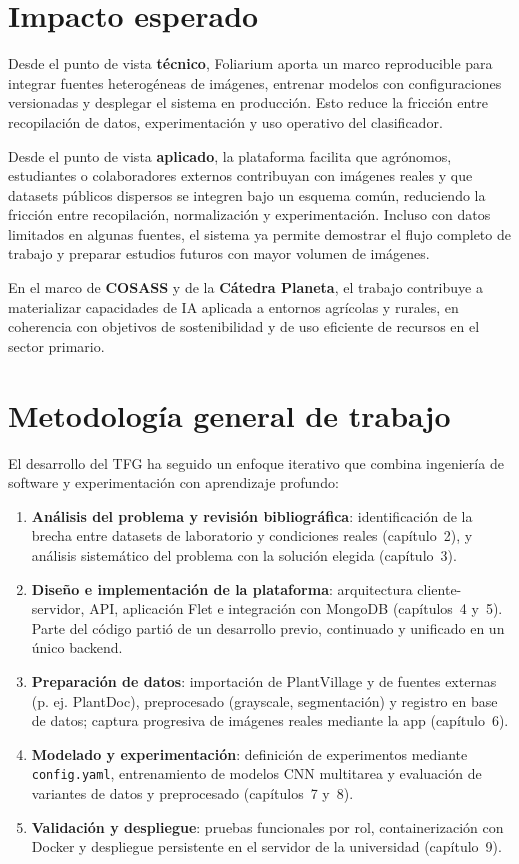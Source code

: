 \documentclass[11pt,spanish,listoffigures,listoftables]{tfgetsinf}
\begin{document}
\section{Impacto esperado}

Desde el punto de vista \textbf{técnico}, Foliarium aporta un marco reproducible para integrar fuentes heterogéneas de imágenes, entrenar modelos con configuraciones versionadas y desplegar el sistema en producción. Esto reduce la fricción entre recopilación de datos, experimentación y uso operativo del clasificador.

Desde el punto de vista \textbf{aplicado}, la plataforma facilita que agrónomos, estudiantes o colaboradores externos contribuyan con imágenes reales y que datasets públicos dispersos se integren bajo un esquema común, reduciendo la fricción entre recopilación, normalización y experimentación. Incluso con datos limitados en algunas fuentes, el sistema ya permite demostrar el flujo completo de trabajo y preparar estudios futuros con mayor volumen de imágenes.

En el marco de \textbf{COSASS} y de la \textbf{Cátedra Planeta}, el trabajo contribuye a materializar capacidades de IA aplicada a entornos agrícolas y rurales, en coherencia con objetivos de sostenibilidad y de uso eficiente de recursos en el sector primario.

\section{Metodología general de trabajo}

El desarrollo del TFG ha seguido un enfoque iterativo que combina ingeniería de software y experimentación con aprendizaje profundo:

\begin{enumerate}
    \item \textbf{Análisis del problema y revisión bibliográfica}: identificación de la brecha entre datasets de laboratorio y condiciones reales (capítulo~2), y análisis sistemático del problema con la solución elegida (capítulo~3).
    \item \textbf{Diseño e implementación de la plataforma}: arquitectura cliente-servidor, API, aplicación Flet e integración con MongoDB (capítulos~4 y~5). Parte del código partió de un desarrollo previo, continuado y unificado en un único backend.
    \item \textbf{Preparación de datos}: importación de PlantVillage y de fuentes externas (p. ej. PlantDoc), preprocesado (grayscale, segmentación) y registro en base de datos; captura progresiva de imágenes reales mediante la app (capítulo~6).
    \item \textbf{Modelado y experimentación}: definición de experimentos mediante \texttt{config.yaml}, entrenamiento de modelos CNN multitarea y evaluación de variantes de datos y preprocesado (capítulos~7 y~8).
    \item \textbf{Validación y despliegue}: pruebas funcionales por rol, containerización con Docker y despliegue persistente en el servidor de la universidad (capítulo~9).
\end{enumerate}
\end{document}
